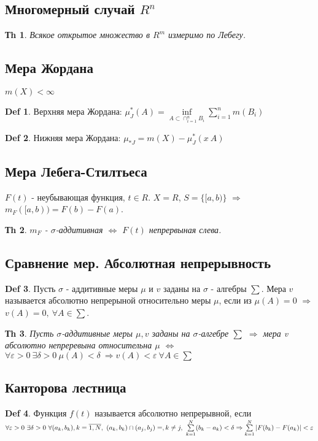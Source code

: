 \documentclass[14pt]{article}
\theoremstyle{plain}
\newtheorem{Thm}{Тh}
\theoremstyle{definition}
\newtheorem{Def}{Def}
\begin{document}
	\subsection{Многомерный случай $R^n$}
		\begin{Thm}
			Всякое открытое множество в $R^m$ измеримо по Лебегу.
		\end{Thm}
	\subsection{Мера Жордана}
		$m(X) < \infty$
		\begin{Def}
			Верхняя мера Жордана: $\mu_J^*(A) = \inf\limits_{A \subset \cap_{i=1}^n B_i} \sum\limits_{i=1}^n m(B_i)$
		\end{Def}
		\begin{Def}
			Нижняя мера Жордана: $\mu_{*J} = m(X) - \mu_J^*( x \ A)$
		\end{Def}
	\subsection{Мера Лебега-Стилтьеса}
		$F(t)$ - неубывающая функция, $t \in R$. $X = R$, $S = \{[a,b) \}$ $\Rightarrow$ $m_F([a,b)) = F(b) - F(a)$.
		\begin{Thm}
			$m_F$ - $\sigma$-аддитивная $\Leftrightarrow$ $F(t)$ непрервыная слева. 
		\end{Thm}
	\subsection{Сравнение мер. Абсолютная непрерывность}
		\begin{Def}
			Пусть $\sigma$ - аддитивные меры $\mu$ и $v$ заданы на $\sigma$ - алгебры $\sum$. Мера $v$ называется абсолютно непрерыной относительно меры $\mu$, если из $\mu(A) = 0$ $\Rightarrow$ $v(A) = 0, \ \forall A \in \sum$.
		\end{Def}
		\begin{Thm}
			Пусть $\sigma$-аддитивные меры $\mu, v$ заданы на $\sigma$-алгебре $\sum$  $\Rightarrow$ мера v абсолютно непреревына относительна $\mu$  $\Leftrightarrow$ $\forall \varepsilon > 0 \ \exists \delta > 0 \ \mu(A) < \delta \  \Rightarrow v(A) < \varepsilon \ \forall A \in \sum$

		\end{Thm}
	\subsection{Канторова лестница}
		\begin{Def}
			Функция $f(t)$ называется абсолютно непрерывной, если $\forall \varepsilon > 0 \ \exists \delta > 0 \ \forall (a_k, b_k), k = \overline{1, N} , \ (a_k, b_k) \cap (a_j, b_j) = \empty, k \neq j, \ \sum\limits_{k=1}^{N} (b_k- a_k) < \delta \Rightarrow \sum\limits_{k=1}^{N} | F(b_k) - F(a_k)| < \varepsilon$
		\end{Def}
\end{document}
